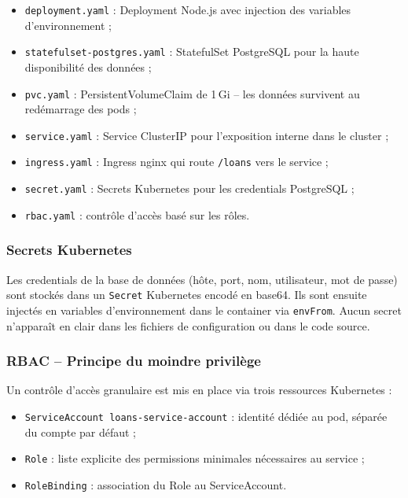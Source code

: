 \documentclass[12pt,a4paper]{article}
\begin{document}
\begin{itemize}[leftmargin=*]
  \item \texttt{deployment.yaml} : Deployment Node.js avec injection des variables d'environnement ;
  \item \texttt{statefulset-postgres.yaml} : StatefulSet PostgreSQL pour la haute disponibilité des données ;
  \item \texttt{pvc.yaml} : PersistentVolumeClaim de 1\,Gi -- les données survivent au redémarrage des pods ;
  \item \texttt{service.yaml} : Service ClusterIP pour l'exposition interne dans le cluster ;
  \item \texttt{ingress.yaml} : Ingress nginx qui route \texttt{/loans} vers le service ;
  \item \texttt{secret.yaml} : Secrets Kubernetes pour les credentials PostgreSQL ;
  \item \texttt{rbac.yaml} : contrôle d'accès basé sur les rôles.
\end{itemize}

\subsubsection*{Secrets Kubernetes}

Les credentials de la base de données (hôte, port, nom, utilisateur, mot de passe) sont stockés
dans un \texttt{Secret} Kubernetes encodé en base64. Ils sont ensuite injectés en variables
d'environnement dans le container via \texttt{envFrom}. Aucun secret n'apparaît en clair
dans les fichiers de configuration ou dans le code source.

\subsubsection*{RBAC -- Principe du moindre privilège}

Un contrôle d'accès granulaire est mis en place via trois ressources Kubernetes :

\begin{itemize}[leftmargin=*]
  \item \texttt{ServiceAccount loans-service-account} : identité dédiée au pod, séparée du compte par défaut ;
  \item \texttt{Role} : liste explicite des permissions minimales nécessaires au service ;
  \item \texttt{RoleBinding} : association du Role au ServiceAccount.
\end{itemize}
\end{document}
